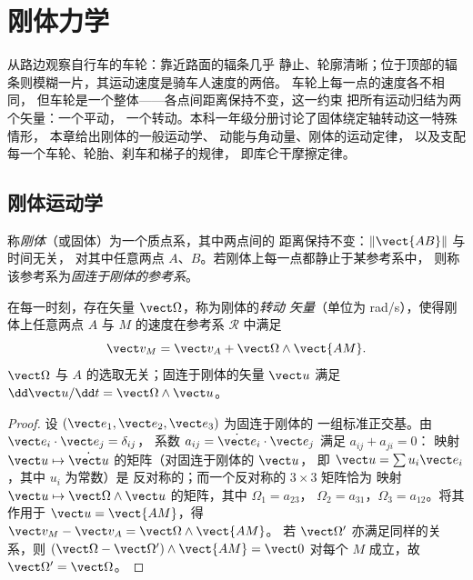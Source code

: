 \chapter{刚体力学}\label{ch:b2:rigid-body-mechanics}

从路边观察自行车的车轮：靠近路面的辐条几乎
静止、轮廓清晰；位于顶部的辐条则模糊一片，其运动速度是骑车人速度的两倍。
车轮上每一点的速度各不相同，
但车轮是一个整体——各点间距离保持不变，这一约束
把所有运动归结为两个矢量：一个平动，
一个转动。本科一年级分册讨论了固体绕定轴转动这一特殊情形，
本章给出刚体的一般运动学、
动能与角动量、刚体的运动定律，
以及支配每一个车轮、轮胎、刹车和梯子的规律，
即库仑干摩擦定律。

\section{刚体运动学}

\begin{definition}[刚体]\label{def:b2:rigid-body-mechanics:solid}
称\emph{刚体}（或固体）为一个质点系，其中两点间的
距离保持不变：$\|\vect{AB}\|$ 与时间无关，
对其中任意两点 $A$、$B$。若刚体上每一点都静止于某参考系中，
则称该参考系为\emph{固连于刚体的参考系}。
\end{definition}

\begin{theorem}[刚体的速度场]\label{thm:b2:rigid-body-mechanics:field}
在每一时刻，存在矢量 $\vect\Omega$，称为刚体的\emph{转动
矢量}（单位为 \unit{rad/s}），使得刚体上任意两点
$A$ 与 $M$ 的速度在参考系 $\mathcal R$ 中满足
\[
\vect v_M = \vect v_A + \vect\Omega\wedge\vect{AM} .
\]
$\vect\Omega$ 与 $A$ 的选取无关；固连于刚体的矢量 $\vect u$
满足 $\dd\vect u/\dd t = \vect\Omega\wedge\vect u$。
\end{theorem}

\begin{proof}
设 $(\vect e_1, \vect e_2, \vect e_3)$ 为固连于刚体的
一组标准正交基。由 $\vect e_i\cdot\vect e_j = \delta_{ij}$，
系数 $a_{ij} = \dot{\vect e}_i\cdot\vect e_j$ 满足 $a_{ij} + a_{ji} = 0$：
映射 $\vect u \mapsto \dot{\vect u}$ 的矩阵（对固连于刚体的 $\vect u$，
即 $\vect u = \sum u_i\vect e_i$，其中 $u_i$ 为常数）是
反对称的；而一个反对称的 $3\times3$ 矩阵恰为
映射 $\vect u \mapsto \vect\Omega\wedge\vect u$ 的矩阵，其中 $\Omega_1 = a_{23}$，
$\Omega_2 = a_{31}$，$\Omega_3 = a_{12}$。将其作用于 $\vect u =
\vect{AM}$，得 $\vect v_M - \vect v_A = \vect\Omega\wedge\vect{AM}$。
若 $\vect\Omega'$ 亦满足同样的关系，则 $(\vect\Omega - \vect\Omega')\wedge
\vect{AM} = \vect 0$ 对每个 $M$ 成立，故 $\vect\Omega' = \vect\Omega$。
\end{proof}

